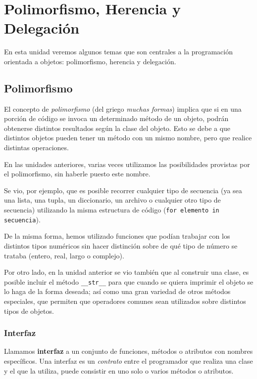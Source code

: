 \chapter{Polimorfismo, Herencia y Delegación}

En esta unidad veremos algunos temas que son centrales a la programación
orientada a objetos: polimorfismo, herencia y delegación.

\section{Polimorfismo}

El concepto de {\it polimorfismo} (del griego {\it muchas formas}) implica
que si en una porción de código se invoca un determinado método de un
objeto, podrán obtenerse distintos resultados según la clase del objeto.
Esto se debe a que distintos objetos pueden tener un método con un mismo
nombre, pero que realice distintas operaciones.

En las unidades anteriores, varias veces utilizamos las posibilidades
provistas por el polimorfismo, sin haberle puesto este nombre.

Se vio, por ejemplo, que es posible recorrer cualquier tipo de secuencia
(ya sea una lista, una tupla, un diccionario, un archivo o cualquier otro tipo
de secuencia) utilizando la misma estructura de código
(\lstinline!for elemento in secuencia!).

De la misma forma, hemos utilizado funciones que podían trabajar con los
distintos tipos numéricos sin hacer distinción sobre de qué tipo de número
se trataba (entero, real, largo o complejo).

Por otro lado, en la unidad anterior se vio también que al construir una
clase, es posible incluir el método \lstinline!__str__! para que cuando se
quiera imprimir el objeto se lo haga de la forma deseada; así como una
gran variedad de otros métodos especiales, que permiten que operadores
comunes sean utilizados sobre distintos tipos de objetos.

\subsection{Interfaz}

Llamamos {\bf interfaz} a un conjunto de funciones, métodos o atributos con
nombres específicos.  Una interfaz es un {\it contrato} entre el
programador que realiza una clase y el que la utiliza, puede consistir en
uno solo o varios métodos o atributos.

